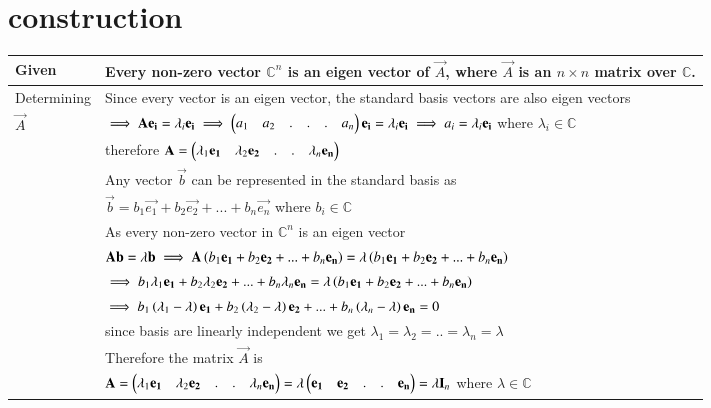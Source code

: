 \documentclass[journal,12pt]{IEEEtran}
\begin{document}
\section{construction}
\renewcommand{\thetable}{1}
\begin{longtable}{|l|l|}
    \hline
    Given & Every non-zero vector $\mathbb{C}^n$ is an eigen vector of $\vec{A}$, where $\vec{A}$ is an $n\times n$ matrix over $\mathbb{C}$.\\
    \hline
    Determining &Since every vector is an eigen vector, the standard basis vectors are also eigen vectors\\
    $\vec{A}$&$\implies\mathbf{A}\mathbf{e_i}=\lambda_i\mathbf{e_i}\implies\begin{pmatrix}a_1&a_2&.&.&.&a_n\end{pmatrix}\mathbf{e_i}=\lambda_i\mathbf{e_i}\implies a_i=\lambda_i\mathbf{e_i}$ where $\lambda_i\in\mathbb{C}$\\
    & therefore $\mathbf{A}=\begin{pmatrix}\lambda_1\mathbf{e_1}&\lambda_2\mathbf{e_2}&.&.&\lambda_n\mathbf{e_n}\end{pmatrix}$\\
    & Any vector $\vec{b}$ can be represented in the standard basis as\\
    &$\vec{b}=b_1\vec{e_1}+b_2\vec{e_2}+...+b_n\vec{e_n}$ where $b_i \in \mathbb{C}$\\
    & As every non-zero vector in $\mathbb{C}^n$ is an eigen vector\\
    & $\mathbf{A}\mathbf{b}=\lambda\mathbf{b}\implies \mathbf{A}\left(b_1\mathbf{e_1}+b_2\mathbf{e_2}+...+b_n\mathbf{e_n}\right)=\lambda\left(b_1\mathbf{e_1}+b_2\mathbf{e_2}+...+b_n\mathbf{e_n}\right)$\\
    &$\implies b_1\lambda_1\mathbf{e_1}+b_2\lambda_2\mathbf{e_2}+...+b_n\lambda_n\mathbf{e_n}=\lambda\left(b_1\mathbf{e_1}+b_2\mathbf{e_2}+...+b_n\mathbf{e_n}\right)$\\
    &$\implies b_1\left(\lambda_1-\lambda\right)\mathbf{e_1}+b_2\left(\lambda_2-\lambda\right)\mathbf{e_2}+...+b_n\left(\lambda_n-\lambda\right)\mathbf{e_n}=0$\\
    & since basis are linearly independent we get $\lambda_1=\lambda_2=..=\lambda_n=\lambda$\\
    & Therefore the matrix $\vec{A}$ is\\
    &\qquad \qquad $\mathbf{A}=\begin{pmatrix}\lambda_1\mathbf{e_1}&\lambda_2\mathbf{e_2}&.&.&\lambda_n\mathbf{e_n}\end{pmatrix}=\lambda\begin{pmatrix}\mathbf{e_1}&\mathbf{e_2}&.&.&\mathbf{e_n}\end{pmatrix}=\lambda\mathbf{I}_n$ where $\lambda\in\mathbb{C}$\\
    \hline
\end{longtable}
\end{document}
